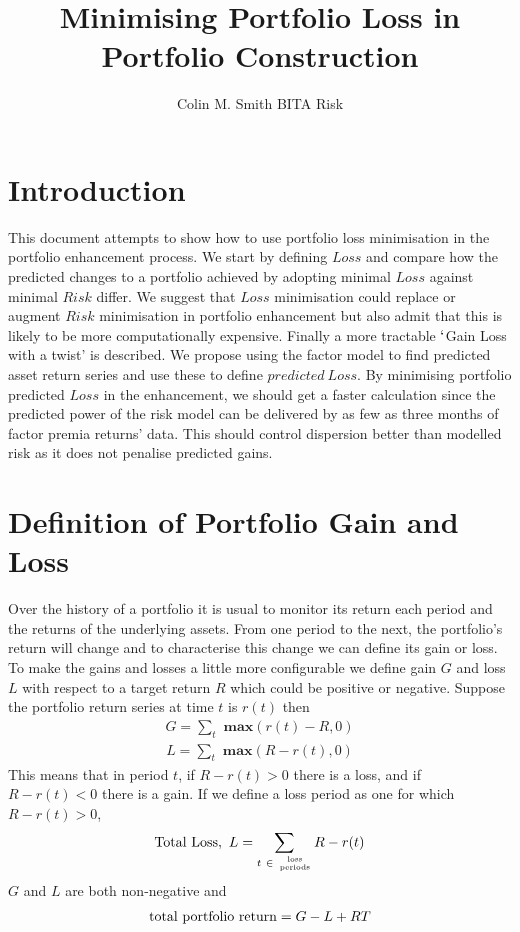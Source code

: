 \documentclass[12pt]{article}
\title{Minimising Portfolio Loss in Portfolio Construction}
\author{Colin M. Smith BITA Risk}
\begin{document}
\maketitle
\tableofcontents
\pagebreak
\doublespacing
\section{Introduction}
This document attempts to show how to use portfolio loss minimisation in the
portfolio enhancement process. We start by defining $Loss$ and compare how
the predicted changes to a portfolio achieved by adopting minimal $Loss$ against minimal $Risk$ differ. 
We suggest that 
$Loss$ minimisation could replace or augment $Risk$ minimisation in portfolio enhancement but also admit
that this is likely to be more computationally expensive.
Finally a more tractable $`$Gain Loss with a twist' is described. We propose using
the factor model to find predicted asset return series and use these to define $predicted\ Loss$. 
By minimising portfolio predicted $Loss$ in the enhancement, we should get a faster calculation since 
the predicted power of the risk model can be delivered by as few as three months of factor premia returns' data.
This should control dispersion better than modelled risk as it does not penalise predicted gains.

\section{Definition of Portfolio Gain and Loss}
Over the history of a portfolio it is usual to monitor its return each period and the returns of the underlying assets.
From one period to the next, the portfolio's return will change and to characterise this change we can define its gain or loss.
To make the gains and losses a little more configurable we define 
gain $G$ and loss $L$ with respect to a target return $R$ which could be positive or negative.
Suppose the portfolio return series at time $t$ is $r(t)$ then
\begin{eqnarray}
    G = \sum_t {\textbf{ max} }(r(t) - R,0)
\end{eqnarray}
\begin{eqnarray}
    L = \sum_t {\textbf{ max} }(R-r(t),0)
\end{eqnarray}
This means that in period $t$, if $R-r(t) > 0$ there is a loss, and if $R-r(t) < 0$ there is a gain.
If we define a loss period as one for which $R-r(t) > 0$,
\begin{eqnarray}
  {\rm Total\ Loss},\ L= \sum_{t\ \in\ \rm {loss\atop periods}} R-r(t)
\end{eqnarray}
$G$ and $L$ are both non-negative and
\begin{eqnarray}
 {\rm   total\ portfolio\ return}= G - L + RT
\end{eqnarray}
\end{document}
